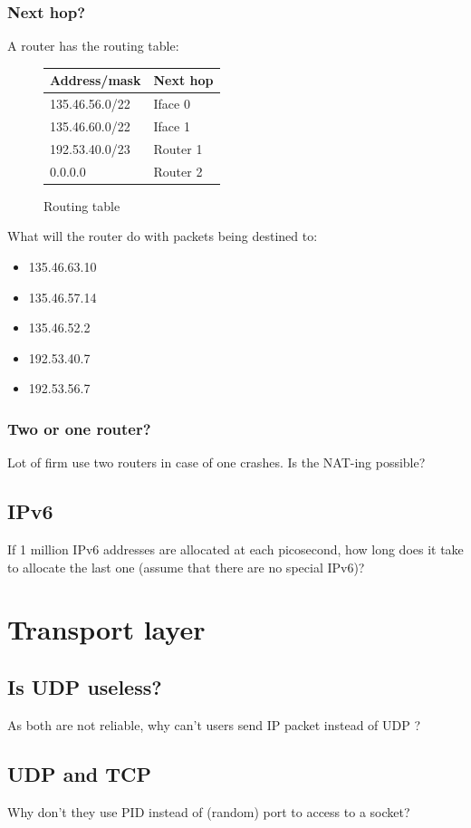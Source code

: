 \documentclass[11pt]{article}
\begin{document}
\subsubsection{Next hop?}
A router has the routing table:
  \begin{figure}[h]
  \centering
    \begin{tabular}{ll}
      \textbf{Address/mask} & Next hop \\ \hline
      135.46.56.0/22        & Iface 0  \\
      135.46.60.0/22        & Iface 1  \\
      192.53.40.0/23        & Router 1 \\
      0.0.0.0               & Router 2 \\ \hline
    \end{tabular}
  \caption{Routing table}
  \end{figure}
What will the router do with packets being destined to:
\begin{itemize}
  \item 135.46.63.10  %
  \item 135.46.57.14  %
  \item 135.46.52.2   %
  \item 192.53.40.7   %
  \item 192.53.56.7   %
\end{itemize}
\subsubsection{Two or one router?}
Lot of firm use two routers in case of one crashes. Is the NAT-ing possible? %

\subsection{IPv6}
If 1 million IPv6 addresses are allocated at each picosecond, how long does it take to allocate the last one (assume that there are no special IPv6)? %

\section{Transport layer}
\subsection{Is UDP useless?}
As both are not reliable, why can't users send IP packet instead of UDP ?

\subsection{UDP and TCP}
Why don't they use PID instead of (random) port to access to a socket?
\end{document}
